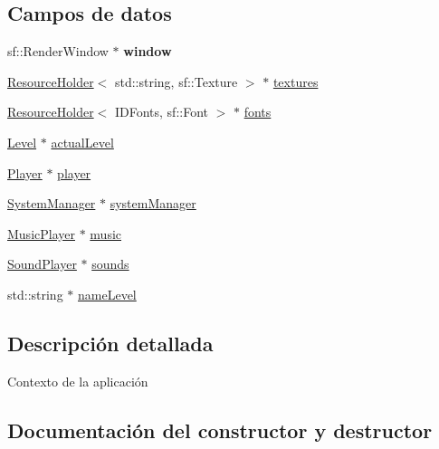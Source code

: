 \subsection*{Campos de datos}
\begin{DoxyCompactItemize}
\item 
\hypertarget{classContext_adfd0cc74ffbdf3f22ae41f4114afb296}{}sf\+::\+Render\+Window $\ast$ {\bfseries window}\label{classContext_adfd0cc74ffbdf3f22ae41f4114afb296}

\item 
\hyperlink{classResourceHolder}{Resource\+Holder}$<$ std\+::string, sf\+::\+Texture $>$ $\ast$ \hyperlink{classContext_a59ac23d12151de1912ab7f6d76e182b8}{textures}
\item 
\hyperlink{classResourceHolder}{Resource\+Holder}$<$ I\+D\+Fonts, sf\+::\+Font $>$ $\ast$ \hyperlink{classContext_a6e5b6ab3c18fc7f42f205774a597cdc1}{fonts}
\item 
\hyperlink{classLevel}{Level} $\ast$ \hyperlink{classContext_ac7837bc30a1a062d5caab054ffedd917}{actual\+Level}
\item 
\hyperlink{classPlayer}{Player} $\ast$ \hyperlink{classContext_a56c6b66908f8cb170e85a5a0e8dc6081}{player}
\item 
\hyperlink{classSystemManager}{System\+Manager} $\ast$ \hyperlink{classContext_a7df558279371bada0354b48cd88353dc}{system\+Manager}
\item 
\hyperlink{classMusicPlayer}{Music\+Player} $\ast$ \hyperlink{classContext_aaec563a152c2a98312c9f72a1b0a342a}{music}
\item 
\hyperlink{classSoundPlayer}{Sound\+Player} $\ast$ \hyperlink{classContext_ad83991aa701d0e22274e61e8bedb186f}{sounds}
\item 
std\+::string $\ast$ \hyperlink{classContext_af675004382eab82f05bd95b5d614e6cf}{name\+Level}
\end{DoxyCompactItemize}


\subsection{Descripción detallada}
Contexto de la aplicación 

\subsection{Documentación del constructor y destructor}
\hypertarget{classContext_a2d34e4556448e40693f61d15e091b604}{}
